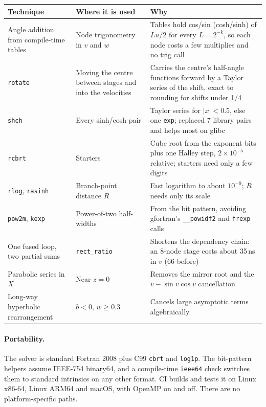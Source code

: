 \documentclass[11pt]{article}
\newcommand{\code}[1]{\texttt{#1}}
\begin{document}
{\small
\begin{tabularx}{\linewidth}{>{\raggedright\arraybackslash}p{3.6cm} >{\raggedright\arraybackslash}p{3.6cm} >{\raggedright\arraybackslash}X}
\toprule
Technique & Where it is used & Why \\
\midrule
Angle addition from compile-time tables & Node trigonometry in $v$ and $w$ & Tables hold cos/sin (cosh/sinh) of $L u/2$ for every $L=2^{-k}$, so each node costs a few multiplies and no trig call \\
\code{rotate} & Moving the centre between stages and into the velocities & Carries the centre's half-angle functions forward by a Taylor series of the shift, exact to rounding for shifts under 1/4 \\
\code{shch} & Every sinh/cosh pair & Taylor series for $|x|<0.5$, else one \code{exp}; replaced 7 library pairs and helps most on glibc \\
\code{rcbrt} & Starters & Cube root from the exponent bits plus one Halley step, $2\times10^{-5}$ relative; starters need only a few digits \\
\code{rlog}, \code{rasinh} & Branch-point distance $R$ & Fast logarithm to about $10^{-9}$; $R$ needs only its scale \\
\code{pow2m}, \code{kexp} & Power-of-two half-widths & From the bit pattern, avoiding gfortran's \code{\_\_powidf2} and \code{frexp} calls \\
One fused loop, two partial sums & \code{rect\_ratio} & Shortens the dependency chain: an 8-node stage costs about 35\,ns in $v$ (66 before) \\
Parabolic series in $X$ & Near $z=0$ & Removes the mirror root and the $v-\sin v\cos v$ cancellation \\
Long-way hyperbolic rearrangement & $b<0$, $w\ge0.3$ & Cancels large asymptotic terms algebraically \\
\bottomrule
\end{tabularx}
}

\paragraph{Portability.} The solver is standard Fortran 2008 plus C99 \code{cbrt} and \code{log1p}. The bit-pattern helpers assume IEEE-754 binary64, and a compile-time \code{ieee64} check switches them to standard intrinsics on any other format. CI builds and tests it on Linux x86-64, Linux ARM64 and macOS, with OpenMP on and off. There are no platform-specific paths.
\end{document}
